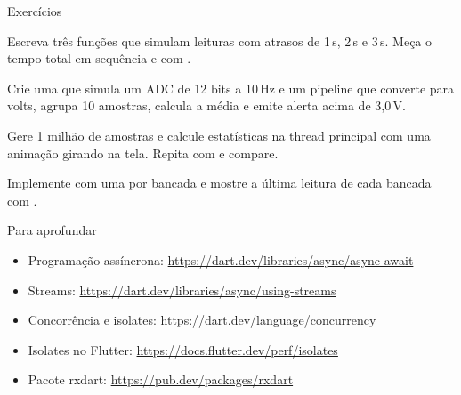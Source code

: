 \documentclass[aspectratio=169,10pt]{beamer}
\begin{document}
\begin{frame}{Exercícios}
  \begin{exercicio}
    Escreva três funções que simulam leituras com atrasos de 1\,s, 2\,s e 3\,s. Meça o tempo total em sequência e com .
  \end{exercicio}
  \begin{exercicio}
    Crie uma  que simula um ADC de 12 bits a 10\,Hz e um pipeline que converte para volts, agrupa 10 amostras, calcula a média e emite alerta acima de 3,0\,V.
  \end{exercicio}
  \begin{exercicio}
    Gere 1 milhão de amostras e calcule estatísticas na thread principal com uma animação girando na tela. Repita com  e compare.
  \end{exercicio}
  \begin{projeto}
    Implemente  com uma  por bancada e mostre a última leitura de cada bancada com .
  \end{projeto}
\end{frame}

\begin{frame}{Para aprofundar}
  \small
  \begin{itemize}
    \item Programação assíncrona: \url{https://dart.dev/libraries/async/async-await}
    \item Streams: \url{https://dart.dev/libraries/async/using-streams}
    \item Concorrência e isolates: \url{https://dart.dev/language/concurrency}
    \item Isolates no Flutter: \url{https://docs.flutter.dev/perf/isolates}
    \item Pacote rxdart: \url{https://pub.dev/packages/rxdart}
  \end{itemize}
\end{frame}
\end{document}
